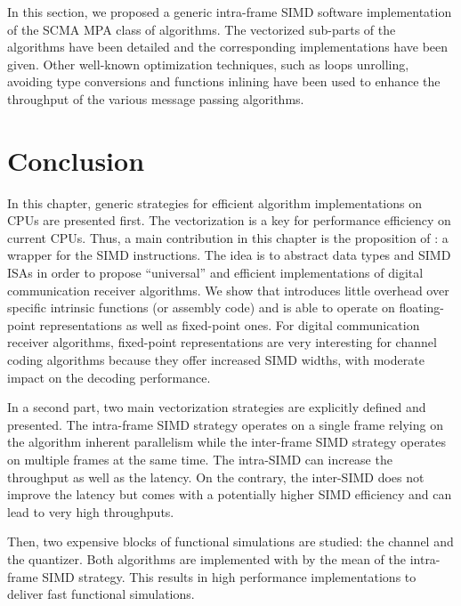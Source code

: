 In this section, we proposed a generic intra-frame SIMD software implementation
of the SCMA MPA class of algorithms. The vectorized sub-parts of the algorithms
have been detailed and the corresponding \MIPP implementations have been given.
Other well-known optimization techniques, such as loops unrolling, avoiding type
conversions and functions inlining have been used to enhance the throughput of
the various message passing algorithms.

\section{Conclusion}

In this chapter, generic strategies for efficient algorithm implementations on
CPUs are presented first. The vectorization is a key for performance efficiency
on current CPUs. Thus, a main contribution in this chapter is the proposition of
\MIPP: a wrapper for the SIMD instructions. The idea is to abstract data types
and SIMD ISAs in order to propose ``universal'' and efficient implementations of
digital communication receiver algorithms. We show that \MIPP introduces little
overhead over specific intrinsic functions (or assembly code) and is able to
operate on floating-point representations as well as fixed-point ones. For
digital communication receiver algorithms, fixed-point representations are very
interesting for channel coding algorithms because they offer increased SIMD
widths, with moderate impact on the decoding performance.

In a second part, two main vectorization strategies are explicitly defined and
presented. The intra-frame SIMD strategy operates on a single frame relying
on the algorithm inherent parallelism while the inter-frame SIMD strategy
operates on multiple frames at the same time. The intra-SIMD can increase the
throughput as well as the latency. On the contrary, the inter-SIMD does not
improve the latency but comes with a potentially higher SIMD efficiency and can
lead to very high throughputs.

Then, two expensive blocks of functional simulations are studied: the channel
and the quantizer. Both algorithms are implemented with \MIPP by the mean of the
intra-frame SIMD strategy. This results in high performance implementations to
deliver fast functional simulations.

